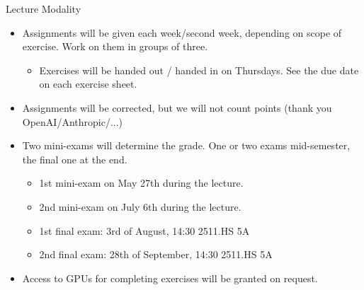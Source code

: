 \begin{frame}{Lecture Modality}
	\begin{itemize}
		\item Assignments will be given each week/second week, depending on scope of exercise. Work on them in groups of three.
            \begin{itemize}
                \item Exercises will be handed out / handed in on Thursdays. See the due date on each exercise sheet.
            \end{itemize}
		\item Assignments will be corrected, but we will not count points (thank you OpenAI/Anthropic/...)
		\item Two mini-exams will determine the grade. One or two exams mid-semester, the final one at the end.
            \begin{itemize}
                \item 1st mini-exam on May 27th during the lecture.
                \item 2nd mini-exam on July 6th during the lecture.
                \item 1st final exam: 3rd of August, 14:30 2511.HS 5A 
                \item 2nd final exam: 28th of September, 14:30 2511.HS 5A 
            \end{itemize}
		\item Access to GPUs for completing exercises will be granted on request.
	\end{itemize}
\end{frame}

